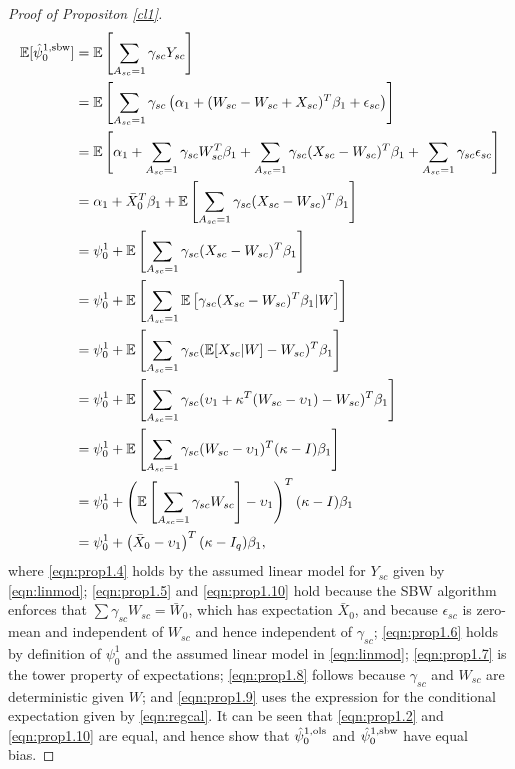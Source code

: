 \begin{proof}[Proof of Propositon \ref{cl1}]
\begin{align}
\nonumber	\mathbb{E}[\hat{\psi}_0^{1, \textup{sbw}}] & = \mathbb{E}\left[ \sum_{A_{sc} = 1} {\gamma}_{sc} Y_{sc}\right] \\
	& = \mathbb{E}\left[ \sum_{A_{sc}=1} {\gamma}_{sc} \left(\alpha_1 + (W_{sc} - W_{sc} + X_{sc})^T \beta_1 + \epsilon_{sc}\right)\right] \label{eqn:prop1.4}\\
\nonumber	& = \mathbb{E}\left[ \alpha_1 + \sum_{A_{sc} = 1} {\gamma}_{sc} W_{sc}^T \beta_1 + \sum_{A_{sc}=1} {\gamma}_{sc} (X_{sc} - W_{sc})^T \beta_1 + \sum_{A_{sc}=1} {\gamma}_{sc} \epsilon_{sc} \right] \\
	& = \alpha_1 + \bar{X}_0^T\beta_1 + \mathbb{E}\left[ \sum_{A_{sc} = 1} {\gamma}_{sc}(X_{sc} - W_{sc})^T \beta_1\right] \label{eqn:prop1.5}\\
	& = \psi_0^1 + \mathbb{E} \left[ \sum_{A_{sc} = 1} {\gamma}_{sc}(X_{sc} - W_{sc})^T \beta_1 \right] \label{eqn:prop1.6} \\
	& = \psi_0^1 + \mathbb{E} \left[ \sum_{A_{sc} = 1} \mathbb{E}\left[ {\gamma}_{sc}(X_{sc} - W_{sc})^T \beta_1 | W \right] \right] \label{eqn:prop1.7} \\
	& = \psi_0^1 + \mathbb{E} \left[ \sum_{A_{sc} = 1}  {\gamma}_{sc} (\mathbb{E}[X_{sc}|W] - W_{sc})^T \beta_1 \right] \label{eqn:prop1.8} \\
	& = \psi_0^1 + \mathbb{E} \left[ \sum_{A_{sc} = 1}  {\gamma}_{sc} (\upsilon_1 + \kappa^T(W_{sc} - \upsilon_1) - W_{sc})^T \beta_1 \right] \label{eqn:prop1.9} \\
\nonumber	& = \psi_0^1 + \mathbb{E} \left[ \sum_{A_{sc} = 1}  {\gamma}_{sc} (W_{sc} - \upsilon_1)^T(\kappa - I)\beta_1 \right] \\
\nonumber	& = \psi_0^1 + \left(\mathbb{E}\left[\sum_{A_{sc} = 1} {\gamma}_{sc} W_{sc}\right] - \upsilon_1\right)^T(\kappa - I)\beta_1  \\
	& = \psi_0^1 + \left(\bar{X}_0 - \upsilon_1\right)^T(\kappa - I_q)\beta_1,  \label{eqn:prop1.10}
\end{align}
%
where \eqref{eqn:prop1.4} holds by the assumed linear model for $Y_{sc}$ given by  \eqref{eqn:linmod}; \eqref{eqn:prop1.5} and \eqref{eqn:prop1.10} hold because the SBW algorithm enforces that $\sum \gamma_{sc} W_{sc} = \bar{W}_0$, which has expectation $\bar{X}_0$, and because $\epsilon_{sc}$ is zero-mean and independent of $W_{sc}$ and hence independent of $\gamma_{sc}$; \eqref{eqn:prop1.6} holds by definition of $\psi_0^1$ and the assumed linear model in \eqref{eqn:linmod}; \eqref{eqn:prop1.7} is the tower property of expectations; \eqref{eqn:prop1.8} follows because $\gamma_{sc}$ and $W_{sc}$ are deterministic given $W$; and \eqref{eqn:prop1.9} uses the expression for the conditional expectation given by \eqref{eqn:regcal}. It can be seen that \eqref{eqn:prop1.2} and \eqref{eqn:prop1.10} are equal, and hence show that $\hat{\psi}_0^{1,\textup{ols}}$ and $\hat{\psi}_0^{1, \textup{sbw}}$ have equal bias.


\end{proof}
